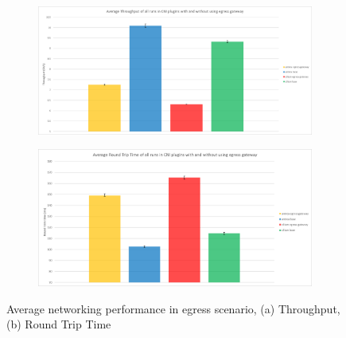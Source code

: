 \begin{figure}[H]
    \centering
    \begin{subfigure}[b]{0.9\textwidth}
        \includegraphics[width=\textwidth]{plots/egress/throughput_total_average.png}
        \caption{}
        \label{fig:throughput_avg}
    \end{subfigure}
    \begin{subfigure}[b]{0.9\textwidth}
        \includegraphics[width=\textwidth]{plots/egress/rtt_total_average.png}
        \caption{}
        \label{fig:rtt_avg}
    \end{subfigure}
    
    \caption{Average networking performance in egress scenario, (a) Throughput, (b) Round Trip Time}
    \label{fig:networking_avg}
\end{figure}

